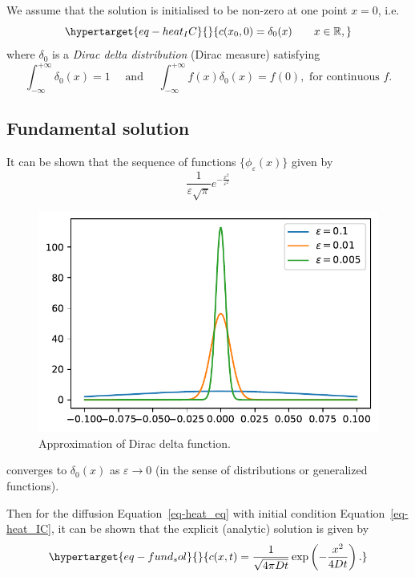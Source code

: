 \documentclass[
  letterpaper,
  DIV=11,
  numbers=noendperiod]{scrreprt}
\theoremstyle{plain}
\theoremstyle{definition}
\theoremstyle{plain}
\theoremstyle{remark}
\begin{document}
We assume that the solution is initialised to be non-zero at one point
\(x=0\), i.e.~\begin{equation}\protect\hypertarget{eq-heat_IC}{}{
c(x_0 , 0) = \delta_0(x)\qquad x \in \mathbb R, 
}\label{eq-heat_IC}\end{equation} where \(\delta_0\) is a \emph{Dirac
delta distribution} (Dirac measure) satisfying \[
\int_{-\infty}^{+\infty} \delta_0(x) = 1 \quad \text{ and } \quad \int_{-\infty}^{+\infty} f(x) \delta_0(x) = f(0) , \text{ for continuous } f. 
\]

\hypertarget{fundamental-solution}{%
\subsection{Fundamental solution}\label{fundamental-solution}}

It can be shown that the sequence of functions
\(\{ \phi_\varepsilon(x) \}\) given by \[
\frac 1{\varepsilon \sqrt{\pi} } e^{ - \frac{x^2}{ \varepsilon^2}}
\]

\begin{figure}

{\centering \includegraphics{linearreactiondiffusion_files/figure-pdf/fig-approxdelta-output-1.pdf}

}

\caption{\label{fig-approxdelta}Approximation of Dirac delta function.}

\end{figure}

converges to \(\delta_0(x)\) as \(\varepsilon \to 0\) (in the sense of
distributions or generalized functions).

Then for the diffusion Equation~\ref{eq-heat_eq} with initial condition
Equation~\ref{eq-heat_IC}, it can be shown that the explicit (analytic)
solution is given by
\begin{equation}\protect\hypertarget{eq-fund_sol}{}{
c(x, t) = \frac1{\sqrt{4 \pi D t}} \exp \left( - \frac{ x^2}{ 4Dt} \right).
}\label{eq-fund_sol}\end{equation}
\end{document}
